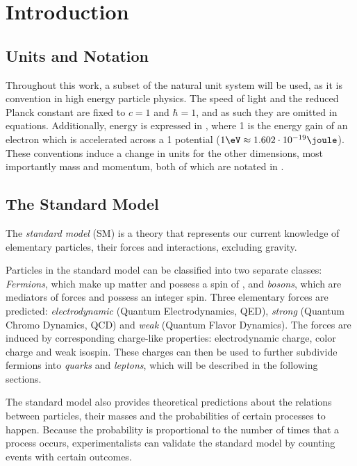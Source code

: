 \chapter{Introduction}

\section{Units and Notation}
Throughout this work, a subset of the natural unit system will be used, as it is convention in high energy particle physics. The speed of light and the reduced Planck constant are fixed to $c = 1$ and $\hbar = 1$, and as such they are omitted in equations. Additionally, energy is expressed in \eV, where \unit{1}{\eV} is the energy gain of an electron which is accelerated across a \unit{1}{\volt} potential ($\unit{1}{\eV} \approx \unit{1.602 \e{-19}}{\joule}$). These conventions induce a change in units for the other dimensions, most importantly mass and momentum, both of which are notated in \eV.

\section{The Standard Model}
The \emph{standard model} (SM) is a theory that represents our current knowledge of elementary particles, their forces and interactions, excluding gravity. 

Particles in the standard model can be classified into two separate classes: \emph{Fermions}, which make up matter and possess a spin of , and \emph{bosons}, which are mediators of forces and possess an integer spin.
Three elementary forces are predicted: \emph{electrodynamic} (Quantum Electrodynamics, QED), \emph{strong} (Quantum Chromo Dynamics, QCD) and \emph{weak} (Quantum Flavor Dynamics). The forces are induced by corresponding charge-like properties: electrodynamic charge, color charge and weak isospin. These charges can then be used to further subdivide fermions into \emph{quarks} and \emph{leptons}, which will be described in the following sections. 

The standard model also provides theoretical predictions about the relations between particles, their masses and the probabilities of certain processes to happen. Because the probability is proportional to the number of times that a process occurs, experimentalists can validate the standard model by counting events with certain outcomes.


